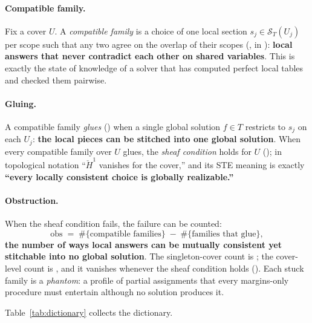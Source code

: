 \documentclass[11pt]{article}
\newcommand{\Sec}{\mathcal S}
\newcommand{\obs}{\mathrm{obs}}
\newcommand{\Hech}{\check H}
\begin{document}
\paragraph{Compatible family.}  Fix a cover $U$.  A \emph{compatible
family} is a choice of one local section $s_j \in \Sec_T(U_j)$ per
scope such that any two agree on the overlap of their scopes
(, in ): \textbf{local
answers that never contradict each other on shared variables}.  This
is exactly the state of knowledge of a solver that has computed
perfect local tables and checked them pairwise.

\paragraph{Gluing.}  A compatible family \emph{glues}
() when a single global solution $f \in T$ restricts
to $s_j$ on each $U_j$: \textbf{the local pieces can be stitched into
one global solution}.  When every compatible family over $U$ glues,
the \emph{sheaf condition} holds for $U$ ();
in topological notation ``$\Hech^1$ vanishes for the cover,'' and its
STE meaning is exactly \textbf{``every locally consistent choice is
globally realizable.''}

\paragraph{Obstruction.}  When the sheaf condition fails, the failure
can be counted:
\[
  \obs \;=\; \#\{\text{compatible families}\} \;-\;
             \#\{\text{families that glue}\},
\]
\textbf{the number of ways local answers can be mutually consistent
yet stitchable into no global solution}.  The singleton-cover count is
; the cover-level count is
, and it vanishes whenever the sheaf
condition holds ().  Each stuck
family is a \emph{phantom}: a profile of partial assignments that
every margins-only procedure must entertain although no solution
produces it.

\medskip
\noindent Table~\ref{tab:dictionary} collects the dictionary.
\end{document}

